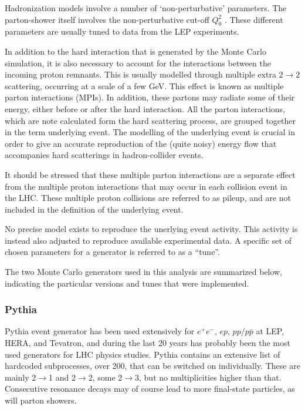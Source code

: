 Hadronization models involve a number of ‘non-perturbative’ parameters. The parton-shower itself involves the non-perturbative cut-off $Q^2_0$ . These different parameters are usually tuned to data from the LEP experiments.


In addition to the hard interaction that is generated by the Monte Carlo
simulation, it is also necessary to account for the interactions between the incoming proton  remnants. This is usually modelled through multiple extra $2\rightarrow 2$ scattering, occurring at a scale of a few GeV. This effect is known as multiple parton interactions (MPIs). In addition, these partons may radiate some of their energy, either before or after the hard interaction.  All the parton interactions, which are note calculated form the hard scattering process, are grouped together in the term underlying event. The modelling of the underlying event is crucial in order to give an accurate reproduction of the (quite noisy) energy flow that accompanies hard scatterings in hadron-collider events.

It should be stressed that these multiple parton interactions are a separate effect from the multiple proton interactions that may occur in each collision event in the LHC. These multiple proton collisions are referred to as pileup, and are not included in the definition of the underlying event. 

No precise model exists to reproduce the unerlying event activity. This activity is instead also adjusted to reproduce available experimental data. A specific set of chosen parameters for a generator is referred to as a ``tune''.  

The two Monte Carlo generators used in this analysis are summarized below, indicating the particular versions and tunes that were implemented.


\subsubsection{Pythia}

{\sc Pythia} event generator has been used extensively for $e^+ e^-$, $ep$, $pp/p\bar{p}$ at LEP, HERA, and Tevatron, and during the last 20 years has probably been the most used generators for LHC physics studies.  {\sc Pythia} contains an extensive list of hardcoded subprocesses, over 200, that can be switched on individually. These are mainly 2$\rightarrow$1 and  2$\rightarrow$2, some  2$\rightarrow$3, but no multiplicities higher than that. Consecutive resonance decays may of course lead to more final-state particles, as will parton showers.

